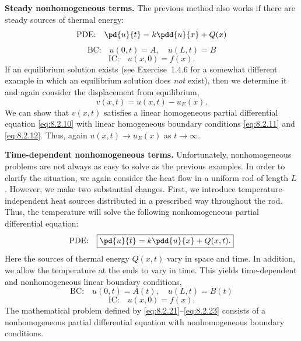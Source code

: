 \textbf{Steady nonhomogeneous terms.}
The previous method also works if there are steady sources of thermal energy:
\begin{equation}
\label{eq:8.2.18}
\text{PDE:}\quad \pd{u}{t} = k\pdd{u}{x} + Q(x)
\end{equation}
\begin{equation}
\label{eq:8.2.19}
\text{BC:}\quad u(0,t) = A,\quad u(L,t) = B
\end{equation}
\begin{equation}
\label{eq:8.2.20}
\text{IC:}\quad u(x,0) = f(x).
\end{equation}
If an equilibrium solution exists (see Exercise~1.4.6 for a somewhat different example in which an equilibrium solution does \emph{not} exist), then we determine it and again consider the displacement from equilibrium,
\[
v(x,t) = u(x,t) - u_E(x).
\]
We can show that $v(x,t)$ satisfies a linear homogeneous partial differential equation \eqref{eq:8.2.10} with linear homogeneous boundary conditions \eqref{eq:8.2.11} and \eqref{eq:8.2.12}.  Thus, again $u(x,t) \to u_E(x)$ as $t\to\infty$.

\textbf{Time-dependent nonhomogeneous terms.}
Unfortunately, nonhomogeneous problems are not always as easy to solve as the previous examples.  In order to clarify the situation, we again consider the heat flow in a uniform rod of length $L$.  However, we make two substantial changes.  First, we introduce temperature-independent heat sources distributed in a prescribed way throughout the rod.  Thus, the temperature will solve the following nonhomogeneous partial differential equation:
\begin{equation}
\label{eq:8.2.21}
\text{PDE:}\quad \boxed{\pd{u}{t} = k\pdd{u}{x} + Q(x,t).}
\end{equation}
Here the sources of thermal energy $Q(x,t)$ vary in space and time.  In addition, we allow the temperature at the ends to vary in time.  This yields time-dependent and nonhomogeneous linear boundary conditions,
\begin{equation}
\label{eq:8.2.22}
\text{BC:}\quad u(0,t) = A(t),\quad u(L,t) = B(t)
\end{equation}
\begin{equation}
\label{eq:8.2.23}
\text{IC:}\quad u(x,0) = f(x).
\end{equation}
The mathematical problem defined by \eqref{eq:8.2.21}--\eqref{eq:8.2.23} consists of a nonhomogeneous partial differential equation with nonhomogeneous boundary conditions.


